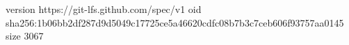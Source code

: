 version https://git-lfs.github.com/spec/v1
oid sha256:1b06bb2df287d9d5049c17725ce5a46620cdfc08b7b3c7ceb606f93757aa0145
size 3067
